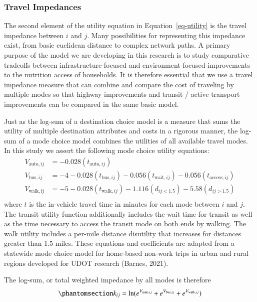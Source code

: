 \documentclass[
  letterpaper,
  number,
  review,
  3p]{elsarticle}
\begin{document}
\subsubsection{Travel Impedances}\label{sec-mcls}

The second element of the utility equation in Equation~\ref{eq-utility}
is the travel impedance between \(i\) and \(j\). Many possibilities for
representing this impedance exist, from basic euclidean distance to
complex network paths. A primary purpose of the model we are developing
in this research is to study comparative tradeoffs between
infrastructure-focused and environment-focused improvements to the
nutrition access of households. It is therefore essential that we use a
travel impedance measure that can combine and compare the cost of
traveling by multiple modes so that highway improvements and transit /
active transport improvements can be compared in the same basic model.

Just as the log-sum of a destination choice model is a measure that sums
the utility of multiple destination attributes and costs in a rigorous
manner, the log-sum of a mode choice model combines the utilities of all
available travel modes. In this study we assert the following mode
choice utility equations: \begin{align*} 
  V_{\mathrm{auto}, ij} &= -0.028(t_{\mathrm{auto}, ij})\\
  V_{\mathrm{bus}, ij} &= -4 -0.028(t_{\mathrm{bus}, ij}) -0.056(t_{\mathrm{wait}, ij}) -0.056(t_{\mathrm{access}, ij})\\
  V_{\mathrm{walk, ij}} &= -5 -0.028(t_{\mathrm{walk}, ij}) -1.116(d_{ij<1.5}) -5.58(d_{ij>1.5})\\
\end{align*} where \(t\) is the in-vehicle travel time in minutes for
each mode between \(i\) and \(j\). The transit utility function
additionally includes the wait time for transit as well as the time
necessary to access the transit mode on both ends by walking. The walk
utility includes a per-mile distance disutility that increases for
distances greater than 1.5 miles. These equations and coefficients are
adapted from a statewide mode choice model for home-based non-work trips
in urban and rural regions developed for UDOT research (Barnes, 2021).

The log-sum, or total weighted impedance by all modes is therefore
\begin{equation}\phantomsection\label{eq-mcls}{
k_{ij} = \ln(e^{V_{\mathrm{auto}, ij}} + e^{V_{\mathrm{bus}, ij}} + e^{V_{\mathrm{walk},ij}})
}\end{equation}
\end{document}
